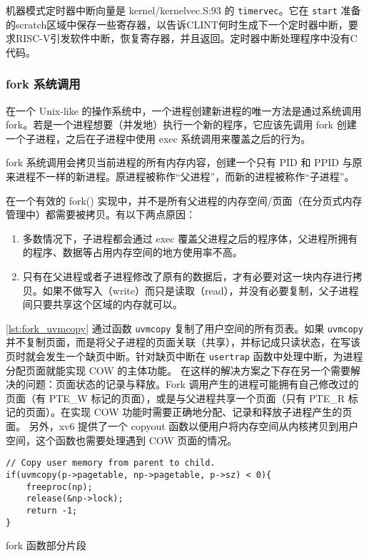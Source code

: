 机器模式定时器中断向量是 kernel/kernelvec.S:93 的 \texttt{timervec}。它在 \texttt{start} 准备的scratch区域中保存一些寄存器，以告诉CLINT何时生成下一个定时器中断，要求RISC-V引发软件中断，恢复寄存器，并且返回。定时器中断处理程序中没有C代码。

\subsubsection{fork 系统调用}

在一个 Unix-like 的操作系统中，一个进程创建新进程的唯一方法是通过系统调用 fork。若是一个进程想要（并发地）执行一个新的程序，它应该先调用 fork 创建一个子进程，之后在子进程中使用 exec 系统调用来覆盖之后的行为。

fork 系统调用会拷贝当前进程的所有内存内容，创建一个只有 PID 和 PPID 与原来进程不一样的新进程。原进程被称作“父进程”，而新的进程被称作“子进程”。

在一个有效的 fork() 实现中，并不是所有父进程的内存空间/页面（在分页式内存管理中）都需要被拷贝。有以下两点原因： 

\begin{enumerate}
	\item 多数情况下，子进程都会通过 exec 覆盖父进程之后的程序体，父进程所拥有的程序、数据等占用内存空间的地方使用率不高。 
	
	\item 只有在父进程或者子进程修改了原有的数据后，才有必要对这一块内存进行拷贝。如果不做写入（write）而只是读取（read），并没有必要复制，父子进程间只要共享这个区域的内存就可以。
\end{enumerate}

\cref{lst:fork_uvmcopy} 通过函数 \texttt{uvmcopy} 复制了用户空间的所有页表。如果 \texttt{uvmcopy} 并不复制页面，而是将父子进程的页面关联（共享），并标记成只读状态，在写该页时就会发生一个缺页中断。针对缺页中断在 \texttt{usertrap} 函数中处理中断，为进程分配页面就能实现 COW 的主体功能。
在这样的解决方案之下存在另一个需要解决的问题：页面状态的记录与释放。Fork 调用产生的进程可能拥有自己修改过的页面（有 PTE\_W 标记的页面），或是与父进程共享一个页面（只有 PTE\_R 标记的页面）。在实现 COW 功能时需要正确地分配、记录和释放子进程产生的页面。
另外，xv6 提供了一个 copyout 函数以便用户将内存空间从内核拷贝到用户空间，这个函数也需要处理遇到 COW 页面的情况。

\begin{listing}[!htb]
	\begin{verbatim}
// Copy user memory from parent to child.
if(uvmcopy(p->pagetable, np->pagetable, p->sz) < 0){
    freeproc(np); 
    release(&np->lock); 
    return -1;
}
	\end{verbatim}
	\caption{fork 函数部分片段}\label{lst:fork_uvmcopy}
\end{listing}

